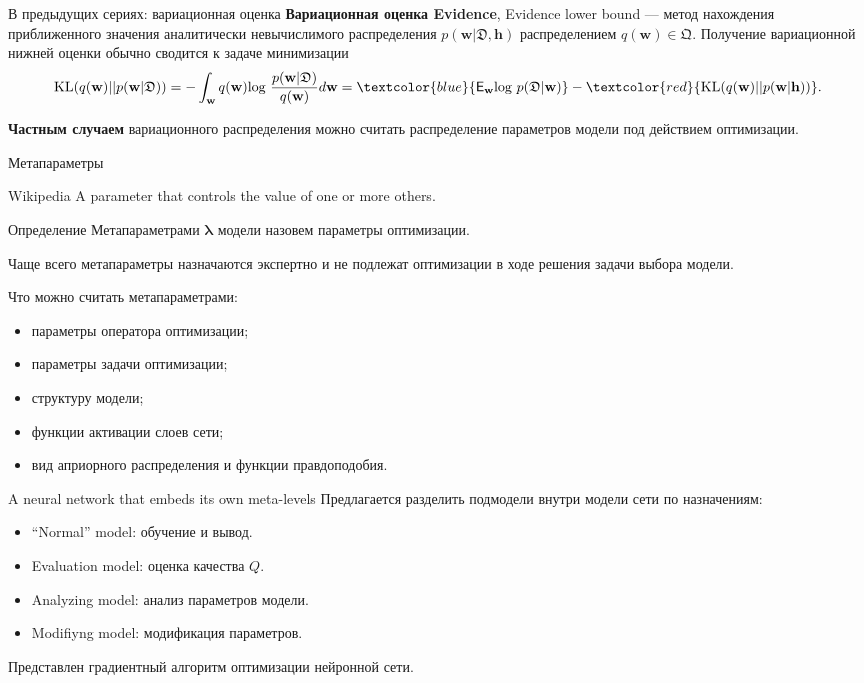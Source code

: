 \documentclass[10pt,pdf,utf8,russian,aspectratio=169]{beamer}
\begin{document}
\begin{frame}{В предыдущих сериях: вариационная оценка}
\textbf{Вариационная оценка Evidence}, Evidence lower bound --- метод нахождения приближенного значения аналитически невычислимого распределения $p(\mathbf{w}|\mathfrak{D}, \mathbf{h})$ распределением $q(\mathbf{w}) \in \mathfrak{Q}$. Получение вариационной нижней оценки обычно сводится к задаче минимизации
$$\text{KL}(q(\mathbf{w})||p(\mathbf{w}| \mathfrak{D}))=
-\int_{\mathbf{w}} q(\mathbf{w}) \text{log}~\frac{p(\mathbf{w}| \mathfrak{D})} {q(\mathbf{w})}d\mathbf{w} = \textcolor{blue}{\mathsf{E}_{\mathbf{w}} \text{log}~p(\mathfrak{D}|\mathbf{w})} - \textcolor{red}{\text{KL}(q(\mathbf{w})||p(\mathbf{w}| \mathbf{h}))}.
$$

\textbf{Частным случаем} вариационного распределения можно считать распределение параметров модели под действием оптимизации.
\end{frame}


\begin{frame}{Метапараметры}
\begin{block}{Wikipedia}
A parameter that controls the value of one or more others.
\end{block}

\begin{block}{Определение}
Метапараметрами $\boldsymbol{\lambda}$ модели назовем параметры оптимизации.
\end{block}

Чаще всего метапараметры назначаются экспертно и не подлежат оптимизации в ходе решения задачи выбора модели. 

Что можно считать метапараметрами:
\begin{itemize}
\item параметры оператора оптимизации;
\item параметры задачи оптимизации;
\item структуру модели;
\item функции активации слоев сети;
\item вид априорного распределения и функции правдоподобия.
\end{itemize}
\end{frame}


\begin{frame}{A neural network that embeds its own meta-levels}
Предлагается разделить подмодели внутри модели сети по назначениям:
\begin{itemize}
\item ``Normal'' model: обучение и вывод.
\item Evaluation model: оценка качества $Q$.
\item Analyzing model: анализ параметров модели.
\item Modifiyng model: модификация параметров.
\end{itemize}

Представлен градиентный алгоритм оптимизации нейронной сети.
\end{frame}
\end{document}

